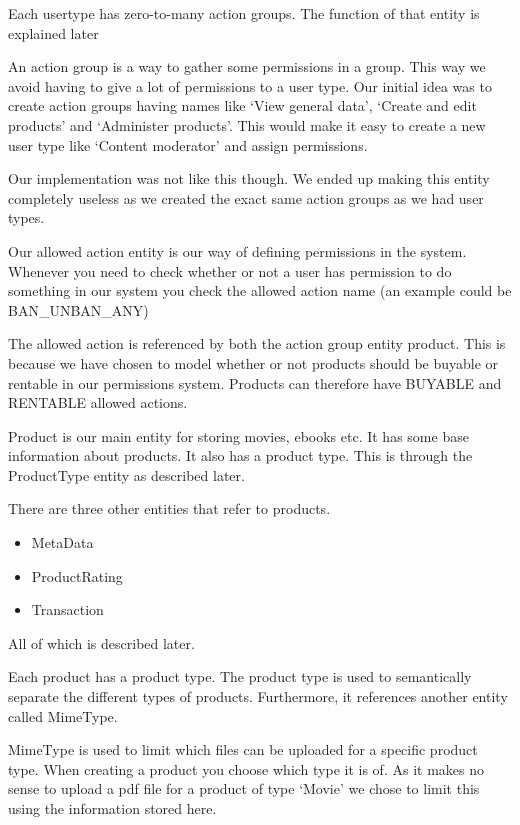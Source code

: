 Each usertype has zero-to-many action groups. The function of that entity is explained later

An action group is a way to gather some permissions in a group. This way we avoid having to give a lot of permissions to a user type. Our initial idea was to create action groups having names like `View general data', `Create and edit products' and `Administer products'. This would make it easy to create a new user type like `Content moderator' and assign permissions.

Our implementation was not like this though. We ended up making this entity completely useless as we created the exact same action groups as we had user types.

Our allowed action entity is our way of defining permissions in the system. Whenever you need to check whether or not a user has permission to do something in our system you check the allowed action name (an example could be BAN\_UNBAN\_ANY)

The allowed action is referenced by both the action group entity product. This is because we have chosen to model whether or not products should be buyable or rentable in our permissions system. Products can therefore have BUYABLE and RENTABLE allowed actions.

Product is our main entity for storing movies, ebooks etc. It has some base information about products. It also has a product type. This is through the ProductType entity as described later.

There are three other entities that refer to products.
\begin{itemize}
	\item MetaData
	\item ProductRating
	\item Transaction
\end{itemize}
All of which is described later.

Each product has a product type. The product type is used to semantically separate the different types of products. Furthermore, it references another entity called MimeType.

MimeType is used to limit which files can be uploaded for a specific product type. When creating a product you choose which type it is of. As it makes no sense to upload a pdf file for a product of type `Movie' we chose to limit this using the information stored here.

